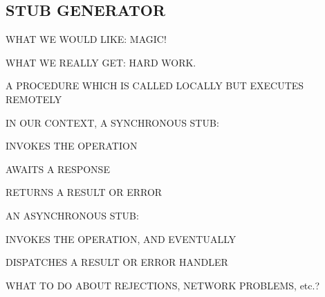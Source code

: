\begin{bwslide}
\part*	{STUB GENERATOR}\bf

\begin{nrtc}
\item	WHAT WE WOULD LIKE: MAGIC!

\item	WHAT WE REALLY GET: HARD WORK.
\end{nrtc}
\end{bwslide}


\begin{bwslide}

\begin{nrtc}
\item	A PROCEDURE WHICH IS CALLED LOCALLY BUT EXECUTES REMOTELY

\item	IN OUR CONTEXT, A SYNCHRONOUS STUB:
    \begin{nrtc}
    \item	INVOKES THE OPERATION

    \item	AWAITS A RESPONSE

    \item	RETURNS A RESULT OR ERROR
    \end{nrtc}

\item	AN ASYNCHRONOUS STUB:
    \begin{nrtc}
    \item	INVOKES THE OPERATION, AND EVENTUALLY

    \item	DISPATCHES A RESULT OR ERROR HANDLER
    \end{nrtc}

\item	WHAT TO DO ABOUT REJECTIONS, NETWORK PROBLEMS, etc.?
\end{nrtc}
\end{bwslide}



